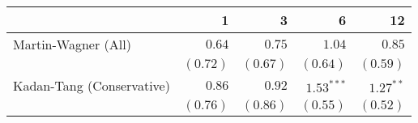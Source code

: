 \begin{tabular}{lrrrr}
\toprule
                                  &         1 &         3 &         6 &        12 \\
\midrule
Martin-Wagner (All)  & $0.64$ & $0.75$ & $1.04$ & $0.85$ \\
 & $(0.72)$ & $(0.67)$ & $(0.64)$ & $(0.59)$ \\
Kadan-Tang (Conservative)  & $0.86$ & $0.92$ & $1.53^{***}$ & $1.27^{**}$ \\
 & $(0.76)$ & $(0.86)$ & $(0.55)$ & $(0.52)$ \\
\bottomrule
\end{tabular}
\\
